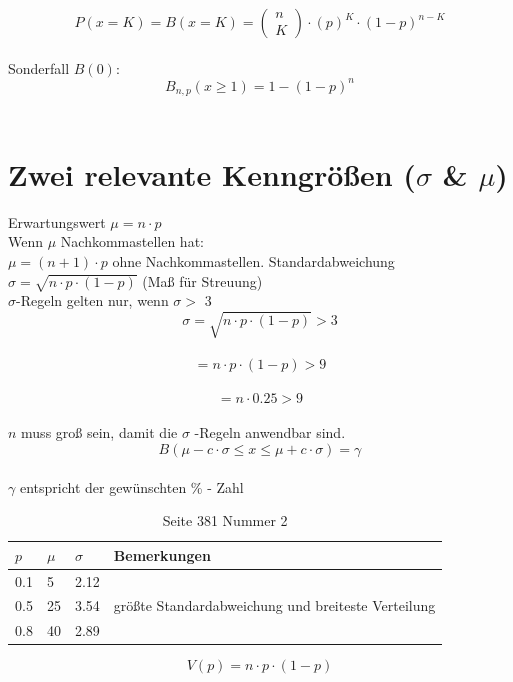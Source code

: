 \documentclass[a4paper,12pt]{article}
\begin{document}
$$P(x=K) = B(x=K) = \begin{pmatrix}n\\K\end{pmatrix} \cdot (p)^K \cdot (1 - p)^{n -K}$$\\

Sonderfall $B(0)$:\\
$$B_{n,p}(x \geq 1) = 1 - (1 - p)^{n}$$\\

\pagebreak
\section*{Zwei relevante Kenngrößen ($\sigma$ \& $\mu$)}
Erwartungswert $\mu = n \cdot p$\\
Wenn $\mu$ Nachkommastellen hat:\\
$\mu = (n + 1) \cdot p$ ohne Nachkommastellen.
Standardabweichung $\sigma = \sqrt{n \cdot p \cdot (1 - p)}$ (Maß für Streuung)\\
$\sigma$-Regeln gelten nur, wenn $\sigma >$ 3\\
$$\sigma = \sqrt{n \cdot p \cdot (1 - p)} > 3$$\\
$$ = n \cdot p \cdot (1 - p) > 9$$\\
$$ = n \cdot 0.25 > 9$$\\
$n$ muss groß sein, damit die $\sigma$ -Regeln anwendbar sind.\\
$$B(\mu - c \cdot \sigma \leq x \leq \mu + c \cdot \sigma) = \gamma$$\\
$\gamma$ entspricht der gewünschten \% - Zahl\\
\begin{table}[h!]
  \begin{center}
    \caption{Seite 381 Nummer 2}
    \label{tab:table5}
    \begin{tabular}{l|l|l|l} %
      \textbf{$p$} & \textbf{$\mu$} & \textbf{$\sigma$} & \textbf{Bemerkungen}\\
      \hline
      0.1 & 5 & 2.12 & \\
      \hline
      0.5 & 25 & 3.54 & größte Standardabweichung und breiteste Verteilung\\
      \hline
      0.8 & 40 & 2.89 & \\
    \end{tabular}
  \end{center}
\end{table}
$$V(p) = n \cdot p \cdot (1 - p)$$\\
\end{document}
